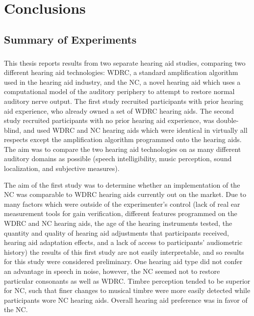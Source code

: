 \chapter{Conclusions}
\section{Summary of Experiments}
\paragraph{}This thesis reports results from two separate hearing aid studies, comparing two different hearing aid technologies: WDRC, a standard amplification algorithm used in the hearing aid industry, and the NC, a novel hearing aid which uses a computational model of the auditory periphery to attempt to restore normal auditory nerve output.  The first study recruited participants with prior hearing aid experience, who already owned a set of WDRC hearing aids.  The second study recruited participants with no prior hearing aid experience, was double-blind, and used WDRC and NC hearing aids which were identical in virtually all respects except the amplification algorithm programmed onto the hearing aids.  The aim was to compare the two hearing aid technologies on as many different auditory domains as possible (speech intelligibility, music perception, sound localization, and subjective measures).

The aim of the first study was to determine whether an implementation of the NC was comparable to WDRC hearing aids currently out on the market.  Due to many factors which were outside of the experimenter's control (lack of real ear measurement tools for gain verification, different features programmed on the WDRC and NC hearing aids, the age of the hearing instruments tested, the quantity and quality of hearing aid adjustments that participants received, hearing aid adaptation effects, and a lack of access to participants' audiometric history) the results of this first study are not easily interpretable, and so results for this study were considered preliminary.  One hearing aid type did not confer an advantage in speech in noise, however, the NC seemed not to restore particular consonants as well as WDRC.  Timbre perception tended to be superior for NC, such that finer changes to musical timbre were more easily detected while participants wore NC hearing aids.  Overall hearing aid preference was in favor of the NC.

